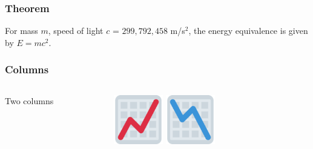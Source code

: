 



\begin{frame}
\frametitle{Theorem}
\begin{theorem}
  For mass $m$, speed of light $c$ = $299,792,458$ m/s$^2$, the energy
  equivalence is given by $E = mc^2.$
\end{theorem}
\end{frame}


\begin{frame}
  \frametitle{Columns}
  
  \begin{columns}
    \begin{column}{0.5\textwidth}
      Two columns
    \end{column}
    \begin{column}{0.5\textwidth}  %
      \begin{center}
        \includegraphics[width=0.25\textwidth]{fig/emoji-graph-upwards.png} \;\;
        \includegraphics[width=0.25\textwidth]{fig/emoji-graph-downwards.png} 
      \end{center}
    \end{column}
  \end{columns}
  
\end{frame}


